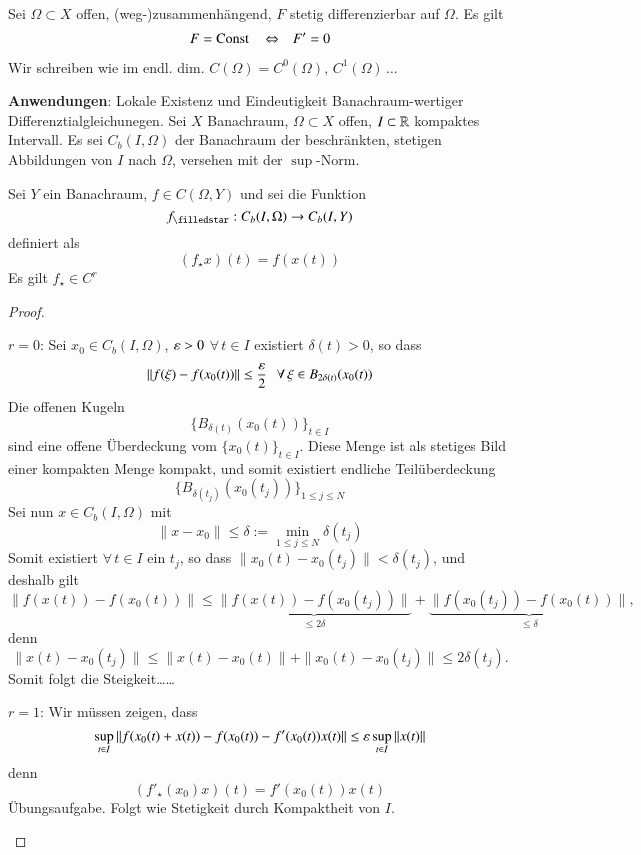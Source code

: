 \begin{cor}\label{1.16}
    Sei $\Omega \subset X$ offen, (weg-)zusammenhängend, $F$ stetig differenzierbar auf $\Omega$.
    Es gilt
    \[
        F= \mathrm{Const} \, \hspace{.25cm} \Leftrightarrow \hspace{.25cm} F'=0
    \]
\end{cor}
\begin{remark}
    Wir schreiben wie im endl. dim. $C(\Omega)= C^0(\Omega), \, C^1(\Omega)\, …$
\end{remark}

\noindent \textbf{Anwendungen}: Lokale Existenz und Eindeutigkeit Banachraum-wertiger
Differenztialgleichunegen. Sei $X$ Banachraum, $\Omega\subset X$ offen, $I\subset \mathbb{R}$
kompaktes Intervall. Es sei $C_b(I,\Omega)$ der Banachraum der beschränkten, stetigen Abbildungen
von $I$ nach $\Omega$, versehen mit der $\sup$-Norm.

\begin{lem}
    Sei $Y$ ein Banachraum, $f\in C(\Omega,Y)$ und sei die Funktion
    \[
        f_\star: C_b(I,\Omega)\ra C_b(I,Y)
    \]
    definiert als
    \[
        (f_\star x)(t)= f(x(t))
    \]
    Es gilt $f_\star\in C^r$
\end{lem}

\begin{proof}
    \begin{description}
    \item{$r=0$:}
    Sei $x_0\in C_b(I,\Omega)$, $\varepsilon>0$ $\forall \, t \in I$ existiert $\delta(t)>0$, so dass
    \[
        \|f(\xi)-f(x_0(t))\|\leq \frac{\varepsilon}{2} \hspace{.25cm} \forall \, \xi\in B_{2\delta(t)}(x_0(t))
    \]
    Die offenen Kugeln 
    \[
        \{ B_{\delta(t)}(x_0(t)) \}_{t\in I}
    \]
    sind eine offene Überdeckung vom $\{ x_0(t) \}_{t\in I}$. Diese Menge ist als stetiges Bild einer
    kompakten Menge kompakt, und somit existiert endliche Teilüberdeckung
    \[
        \{ B_{\delta(t_j)}(x_0(t_j)) \}_{1\leq j \leq N}
    \]
    Sei nun $x\in C_b(I,\Omega)$ mit
    \[
        \|x-x_0\|\leq \delta := \min_{1\leq j \leq N}\delta(t_j)
    \]
    Somit existiert $\forall \, t\in I$ ein $t_j$, so dass $\|x_0(t)-x_0(t_j)\|< \delta(t_j)$,
    und deshalb gilt
    \[
        \|f(x(t))- f(x_0(t))\|\leq \underbrace{\|f(x(t))-f(x_0(t_j))\|}_{\leq 2\delta}
        +\underbrace{\|f(x_0(t_j))-f(x_0(t))\|}_{\leq\delta},
    \]
    denn
    \[
        \|x(t)-x_0(t_j)\|\leq \|x(t)-x_0(t)\|+\|x_0(t)-x_0(t_j)\|\leq 2\delta(t_j).
    \]
    Somit folgt die Steigkeit……
    \item{$r=1$:}
    Wir müssen zeigen, dass
    \[
        \sup_{t\in I} \|f(x_0(t)+x(t))- f(x_0(t)) - f'(x_0(t))x(t)\|\leq \varepsilon \sup_{t\in I}\|x(t)\|
    \]
    denn
    \[
        (f'_\star(x_0)x)(t)= f'(x_0(t))x(t)
    \]
    Übungsaufgabe. Folgt wie Stetigkeit durch Kompaktheit von $I$.
    \end{description}
    \[  \]
\end{proof}
